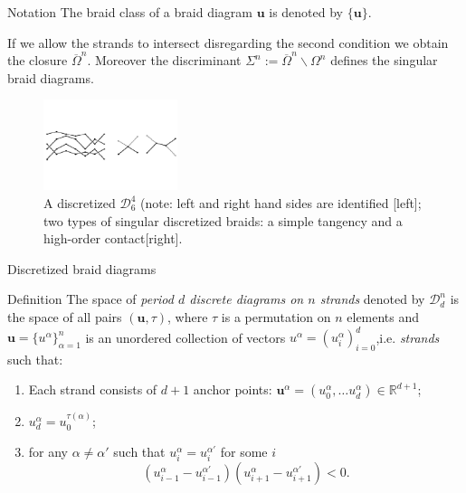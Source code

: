 \documentclass[9pt, english]{beamer}
\theoremstyle{definition}
\newcommand{\simbolovettore}[1]{{\boldsymbol{#1}}}
\newcommand{\vu}{\simbolovettore{u}}
\newcommand{\R}{\mathbb{R}}                     %
\begin{document}
\begin{frame}
    \begin{block}{Notation}
            The braid class of a braid diagram $\vu$ is denoted by
            $\{\vu\}$.\pause

            If we allow the strands to intersect disregarding the
            second condition we obtain the closure
            $\overline \Omega^n$. Moreover the discriminant $\Sigma^n:= \overline \Omega^n \backslash \Omega^n$
            defines the \alert{singular braid diagrams}.\pause
    \end{block}
        \begin{figure}\label{fig:discretized}
            \includegraphics[width=0.35\textwidth]{images/Fig2Kyoto2.pdf}\caption{A discretized $\mathscr D_6^4$ (note: left and right
            hand sides are identified [left]; two types of singular discretized braids: a simple
            tangency and a high-order contact[right].}
        \end{figure}
\end{frame}
\begin{frame}{Discretized braid diagrams}
    \begin{block}{Definition}
        The space of {\em period $d$ discrete diagrams on $n$ strands\/}
        denoted by $\mathscr D_d^n$ is the space of all pairs $(\vu,
        \tau)$, \pause where $\tau$ is a permutation on $n$ elements \pause and
        $\vu=\{u^\alpha\}_{\alpha=1}^n$ is an unordered collection of
        vectors $u^\alpha=(u_i^\alpha)_{i=0}^d$,\pause i.e. {\em strands\/}
        such that:
        \begin{enumerate}
        \item Each strand consists of $d+1$ anchor points: $\vu^\alpha=(u_0^\alpha, \dots u_d^\alpha)\in
        \R^{d+1}$;\pause
        \item {} $u_d^\alpha= u_0^{\tau(\alpha)}$;\pause
        \item {} for any $\alpha\neq \alpha'$ such
        that $u_i^\alpha=u_i^{\alpha'}$ for some $i$
        \[
        (u_{i-1}^\alpha - u_{i-1}^{\alpha'})(u_{i+1}^\alpha-
        u_{i+1}^{\alpha'})<0.
        \]
        \end{enumerate}
        \end{block}
\end{frame}
\end{document}
